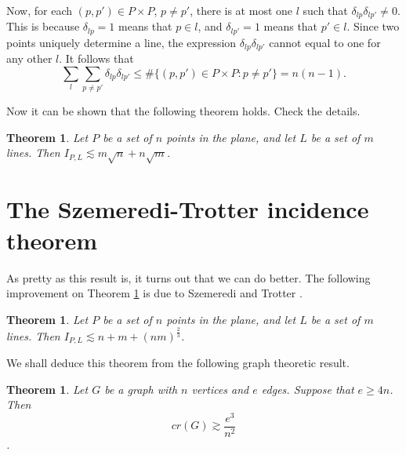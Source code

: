 \documentclass[]{stml-l}
\numberwithin{equation}{chapter}
\theoremstyle{plain}
\newtheorem{theorem}[equation]{Theorem}
\theoremstyle{definition}
\theoremstyle{remark}
\begin{document}
Now, for each $(p,p') \in P \times P$, $p \not=p'$, there is at most one $l$
such that $\delta_{lp}\delta_{lp'} \not=0$. This is because $\delta_{lp}=1$
means that $p \in l$, and $\delta_{lp'}=1$ means that $p' \in l$. Since two
points uniquely determine a line, the expression $\delta_{lp}\delta_{lp'}$
cannot equal to one for any other $l$. It follows that
\begin{equation}
\sum_l \sum_{p \not=p'} \delta_{lp}\delta_{lp'} \leq \# \{(p,p') \in P \times P:
p \not=p'\}=n(n-1).
\end{equation}



Now it can be shown that the following theorem holds.  Check the details.

%

%


\begin{theorem} \label{incidencebound.thm}
Let $P$ be a set of $n$ points in the plane, and let
$L$ be a set of $m$ lines. Then $I_{P,L} \lesssim m \sqrt{n} +  n \sqrt{m}$.

\end{theorem}

\section{The Szemeredi-Trotter incidence theorem}

As pretty as this result is, it turns out that we can do better.
The following improvement on Theorem \ref{incidencebound.thm} is
due to Szemeredi and Trotter \cite{Sze2}.

\begin{theorem} \label{SzemTrot}
Let $P$ be a set of $n$ points in the plane, and let
$L$ be a set of $m$ lines. Then $I_{P,L} \lesssim n+m+{(nm)}^{\frac{2}{3}}$.
\end{theorem}

We shall deduce this theorem from the following graph theoretic result.

\begin{theorem} \label{crossings}
Let $G$ be a graph with $n$ vertices and $e$
edges. Suppose that $e \ge 4n$. Then \[cr(G) \gtrsim \frac{e^3}{n^2}\].
\end{theorem}
\end{document}
